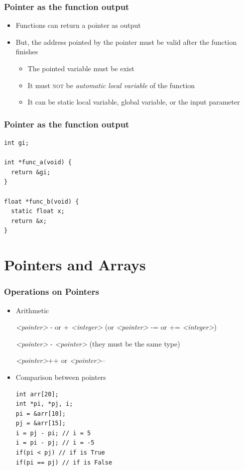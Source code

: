 \documentclass{../c-lecture}
\begin{document}
\begin{frame}
  \frametitle{Pointer as the function output}
  \begin{itemize}
    \item Functions can return a pointer as output
    \item
      But, the address pointed by the pointer must be valid after the function
      finishes

    \begin{itemize}
      \item The pointed variable must be exist
      \item
        It must \textsc{\color{RubineRed} not} be
        \textit{\color{Orange} automatic local variable} of the function

      \item
        It can be static local variable, global variable, or the input parameter

    \end{itemize}
  \end{itemize}
\end{frame}

\begin{frame}[fragile]
  \frametitle{Pointer as the function output}
  \begin{verbatim}
int gi;

int *func_a(void) {
  return &gi;
}

float *func_b(void) {
  static float x;
  return &x;
}
  \end{verbatim}
\end{frame}

\section{Pointers and Arrays}

\begin{frame}[fragile]
  \frametitle{Operations on Pointers}
  \begin{itemize}
    \item Arithmetic
    \begin{block}{}
      \textit{\color{YellowOrange}<pointer>} - or +
      \textit{\color{YellowOrange}<integer>} (or
      \textit{\color{YellowOrange}<pointer>} -= or +=
      \textit{\color{YellowOrange}<integer>})

      \textit{\color{YellowOrange}<pointer>} -
      \textit{\color{YellowOrange}<pointer>} (they must be the same
      type)

      \textit{\color{YellowOrange}<pointer>}++ or
      \textit{\color{YellowOrange}<pointer>}--
    \end{block}
    \item Comparison between pointers
    \begin{verbatim}
int arr[20];
int *pi, *pj, i;
pi = &arr[10];
pj = &arr[15];
i = pj - pi; // i = 5
i = pi - pj; // i = -5
if(pi < pj) // if is True
if(pi == pj) // if is False
    \end{verbatim}
  \end{itemize}
\end{frame}
\end{document}
